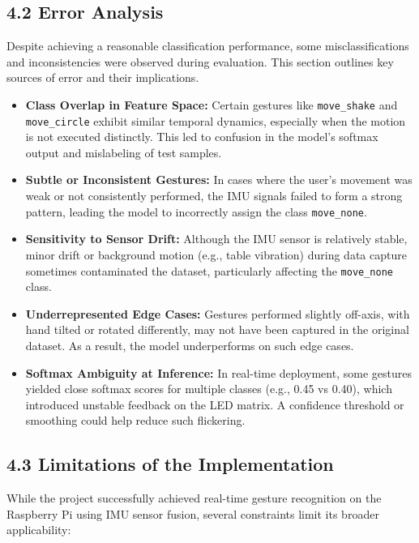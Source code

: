 \documentclass[a4paper,12pt]{article}
\begin{document}
\subsection*{4.2 Error Analysis}

Despite achieving a reasonable classification performance, some misclassifications and inconsistencies were observed during evaluation. This section outlines key sources of error and their implications.

\begin{itemize}
    \item \textbf{Class Overlap in Feature Space:} Certain gestures like \texttt{move\_shake} and \texttt{move\_circle} exhibit similar temporal dynamics, especially when the motion is not executed distinctly. This led to confusion in the model’s softmax output and mislabeling of test samples.

    \item \textbf{Subtle or Inconsistent Gestures:} In cases where the user’s movement was weak or not consistently performed, the IMU signals failed to form a strong pattern, leading the model to incorrectly assign the class \texttt{move\_none}.

    \item \textbf{Sensitivity to Sensor Drift:} Although the IMU sensor is relatively stable, minor drift or background motion (e.g., table vibration) during data capture sometimes contaminated the dataset, particularly affecting the \texttt{move\_none} class.

    \item \textbf{Underrepresented Edge Cases:} Gestures performed slightly off-axis, with hand tilted or rotated differently, may not have been captured in the original dataset. As a result, the model underperforms on such edge cases.

    \item \textbf{Softmax Ambiguity at Inference:} In real-time deployment, some gestures yielded close softmax scores for multiple classes (e.g., 0.45 vs 0.40), which introduced unstable feedback on the LED matrix. A confidence threshold or smoothing could help reduce such flickering.
\end{itemize}

\subsection*{4.3 Limitations of the Implementation}

While the project successfully achieved real-time gesture recognition on the Raspberry Pi using IMU sensor fusion, several constraints limit its broader applicability:
\end{document}
